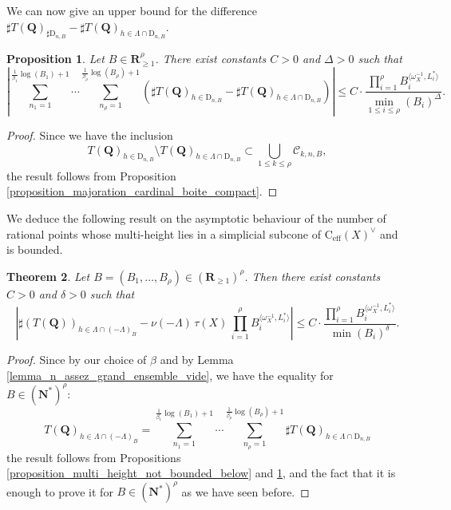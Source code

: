 \documentclass{proc-l}
\newcommand{\R}{\mathbf{R}}
\newcommand{\N}{\mathbf{N}}
\newcommand{\Q}{\mathbf{Q}}
\newcommand{\cone}{\text{C}_{\text{eff}}(X)}
\newcommand{\w}{\omega}
\newtheorem{theorem}{Theorem}[section]
\newtheorem{prop}[theorem]{Proposition}
\theoremstyle{definition}
\theoremstyle{remark}
\numberwithin{equation}{section}
\begin{document}
We can now give an upper bound for the difference $\sharp T(\Q)_{\sharp \mathrm{D}_{n,B}} - \sharp T(\Q)_{h \in \Lambda \cap \mathrm{D}_{n,B}}$.

\begin{prop}\label{proposition_majoration_boite_non_compact}
Let \(B \in \R_{\geqslant 1}^{\rho}\).
There exist constants \(C > 0\) and \(\Delta > 0\) such that
\[
\left|
\sum_{n_1 = 1}^{\frac{1}{\beta_1}\log(B_1) + 1}
\cdots
\sum_{n_{\rho} = 1}^{\frac{1}{\beta_{\rho}}\log(B_{\rho}) + 1}
\left(
\sharp T(\Q)_{h \in \mathrm{D}_{n,B}}
-
\sharp T(\Q)_{h \in \Lambda \cap \mathrm{D}_{n,B}}
\right)
\right|
\leqslant
C \cdot
\frac{\prod_{i = 1}^{\rho}
B_i^{\langle \w_{X}^{-1}, L_i^{*} \rangle}}
{\min\limits_{1 \leqslant i \leqslant \rho}(B_i)^{\Delta}}.
\]
\end{prop}


\begin{proof}
Since we have the inclusion
\[
T(\Q)_{h \in \mathrm{D}_{n,B}}
\setminus
T(\Q)_{h \in \Lambda \cap \mathrm{D}_{n,B}}
\subset
\bigcup_{1 \leqslant k \leqslant \rho} \mathcal{C}_{k,n,B},
\]
the result follows from Proposition \ref{proposition_majoration_cardinal_boite_compact}.
\end{proof}

We deduce the following result on the asymptotic behaviour of the number of rational points whose multi-height lies in a simplicial subcone of \(\cone^{\vee}\) and is bounded.

\begin{theorem}\label{theorem_multi_height_value_in_subcone}
Let \(B = (B_1,\ldots,B_{\rho}) \in (\R_{\geqslant 1})^{\rho}\).
Then there exist constants \(C > 0\) and \(\delta > 0\) such that
\[
\left|
\sharp ( T(\Q) )_{h \in \Lambda \cap (-\Lambda)_{B} }
-
\nu(-\Lambda)\, \tau(X)\,
\prod_{i = 1}^{\rho}
B_i^{\langle \w_{X}^{-1}, L_i^* \rangle}
\right|
\leqslant
C \cdot
\frac{\prod_{i = 1}^{\rho}
B_i^{\langle \w_{X}^{-1}, L_i^* \rangle}}
{\min(B_i)^{\delta}}.
\]
\end{theorem}

\begin{proof}
Since by our choice of $\beta$ and by Lemma \ref{lemma_n_assez_grand_ensemble_vide}, we have the equality for \\ $B \in (\N^*)^{\rho}$:
\[
T(\Q)_{h \in \Lambda \cap (-\Lambda)_B}
=
\sum_{n_1 = 1}^{\frac{1}{\beta_1}\log(B_1) + 1}
\cdots
\sum_{n_{\rho} = 1}^{\frac{1}{\beta_{\rho}}\log(B_{\rho}) + 1}
\sharp T(\Q)_{h \in \Lambda \cap \mathrm{D}_{n,B}}
\]
the result follows from
Propositions \ref{proposition_multi_height_not_bounded_below}
and \ref{proposition_majoration_boite_non_compact}, and the fact that it is enough to prove it for $B \in (\N^*)^{\rho}$ as we have seen before.
\end{proof}
\end{document}

